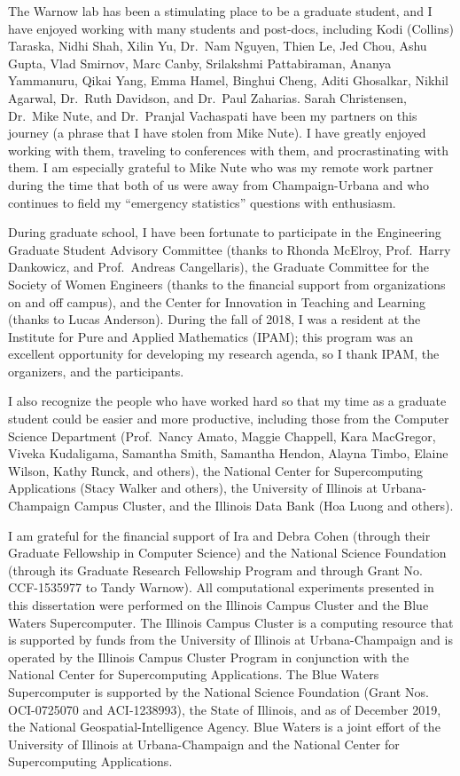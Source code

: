 \documentclass[tocnosub, noragright, centerchapter, fullpagesingle, 12pt]{uiuc_csthesis18}
\numberwithin{algocf}{chapter}
\theoremstyle{definition}
\begin{document}
\begin{acknowledgments}
The Warnow lab has been a stimulating place to be a graduate student, and I have enjoyed working with many students and post-docs, including Kodi (Collins) Taraska, Nidhi Shah, Xilin Yu, Dr.~Nam Nguyen, Thien Le, Jed Chou, Ashu Gupta, Vlad Smirnov, Marc Canby, Srilakshmi Pattabiraman, Ananya Yammanuru, Qikai Yang, Emma Hamel, Binghui Cheng, Aditi Ghosalkar, Nikhil Agarwal, Dr.~Ruth Davidson, and Dr.~Paul Zaharias.
Sarah Christensen, Dr.~Mike Nute, and Dr.~Pranjal Vachaspati have been my partners on this journey (a phrase that I have stolen from Mike Nute).
I have greatly enjoyed working with them, traveling to conferences with them, and procrastinating with them.
I am especially grateful to Mike Nute who was my remote work partner during the time that both of us were away from Champaign-Urbana and who continues to field my ``emergency statistics'' questions with enthusiasm.

During graduate school, I have been fortunate to participate in the Engineering Graduate Student Advisory Committee (thanks to Rhonda McElroy, Prof.~Harry Dankowicz, and Prof.~Andreas Cangellaris), the Graduate Committee for the Society of Women Engineers (thanks to the financial support from organizations on and off campus), and the Center for Innovation in Teaching and Learning (thanks to Lucas Anderson). 
During the fall of 2018, I was a resident at the Institute for Pure and Applied Mathematics (IPAM); this program was an excellent opportunity for developing my research agenda, so I thank IPAM, the organizers, and the participants.

I also recognize the people who have worked hard so that my time as a graduate student could be easier and more productive, including those from the Computer Science Department (Prof.~Nancy Amato, Maggie Chappell, Kara MacGregor, Viveka Kudaligama, Samantha Smith, Samantha Hendon, Alayna Timbo, Elaine Wilson,  Kathy Runck, and others), the National Center for Supercomputing Applications (Stacy Walker and others), the University of Illinois at Urbana-Champaign Campus Cluster, and the Illinois Data Bank (Hoa Luong and others).

I am grateful for the financial support of Ira and Debra Cohen (through their Graduate Fellowship in Computer Science) and the National Science Foundation (through its Graduate Research Fellowship Program and through Grant No. CCF-1535977 to Tandy Warnow).
All computational experiments presented in this dissertation were performed on the Illinois Campus Cluster and the Blue Waters Supercomputer.
The Illinois Campus Cluster is a computing resource that is supported by funds from the University of Illinois at Urbana-Champaign and is operated by the Illinois Campus Cluster Program in conjunction with the National Center for Supercomputing Applications.
The Blue Waters Supercomputer is supported by the National Science Foundation (Grant Nos. OCI-0725070 and ACI-1238993), the State of Illinois, and as of December 2019, the National Geospatial-Intelligence Agency. 
Blue Waters is a joint effort of the University of Illinois at Urbana-Champaign and the National Center for Supercomputing Applications.


\end{acknowledgments}
\end{document}
